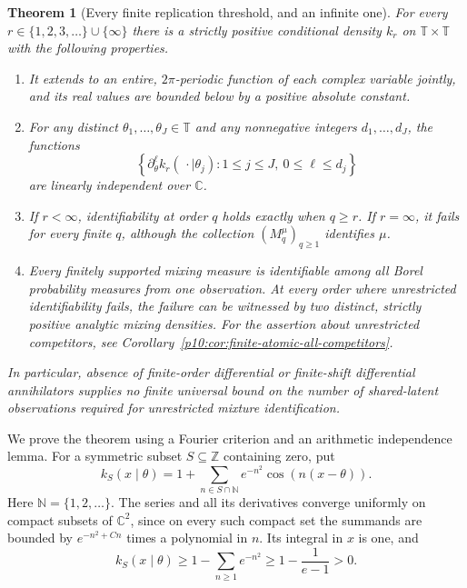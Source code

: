 \documentclass[11pt,letterpaper]{article}
\newtheorem{theorem}{Theorem}[section]
\theoremstyle{definition}
\theoremstyle{remark}
\newcommand{\1}{\mathbf 1}
\begin{document}
\begin{theorem}[Every finite replication threshold, and an infinite one]
\label{p10:thm:every-replication-threshold}
For every $r\in\{1,2,3,\ldots\}\cup\{\infty\}$ there is a strictly positive
conditional density $k_r$ on $\mathbb T\times\mathbb T$ with the following
properties.
\begin{enumerate}
\item It extends to an entire, $2\pi$-periodic function of each complex
variable jointly, and its real values are bounded below by a positive
absolute constant.
\item For any distinct $\theta_1,\ldots,\theta_J\in\mathbb T$ and any
nonnegative integers $d_1,\ldots,d_J$, the functions
\[
 \left\{\partial_\theta^\ell k_r(\,\cdot\mid\theta_j):
       1\le j\le J,\ 0\le\ell\le d_j\right\}
\]
are linearly independent over $\mathbb C$.
\item If $r<\infty$, identifiability at order $q$ holds exactly when
$q\ge r$.  If $r=\infty$, it fails for every finite $q$, although the
collection $(M_q^\mu)_{q\ge1}$ identifies $\mu$.
\item Every finitely supported mixing measure is identifiable among
all Borel probability measures from one observation.  At every order
where unrestricted identifiability fails, the failure can be witnessed
by two distinct, strictly positive analytic mixing densities.
For the assertion about unrestricted competitors, see
Corollary~\ref{p10:cor:finite-atomic-all-competitors}.
\end{enumerate}
In particular, absence of finite-order differential or finite-shift
differential annihilators supplies no finite universal bound on the
number of shared-latent observations required for unrestricted mixture
identification.
\end{theorem}

We prove the theorem using a Fourier criterion and an arithmetic
independence lemma.  For a symmetric subset $S\subseteq\mathbb Z$
containing zero, put
\begin{equation}\label{p10:eq:spectral-kernel}
 k_S(x\mid\theta)
 =1+\sum_{n\in S\cap\mathbb N}e^{-n^2}\cos(n(x-\theta)).
\end{equation}
Here $\mathbb N=\{1,2,\ldots\}$.  The series and all its derivatives
converge uniformly on compact subsets of $\mathbb C^2$, since on every
such compact set the summands are bounded by $e^{-n^2+Cn}$ times a
polynomial in $n$.  Its integral in $x$ is one, and
\[
 k_S(x\mid\theta)\ge 1-\sum_{n\ge1}e^{-n^2}
 \ge 1-\frac1{e-1}>0.
\]
\end{document}

